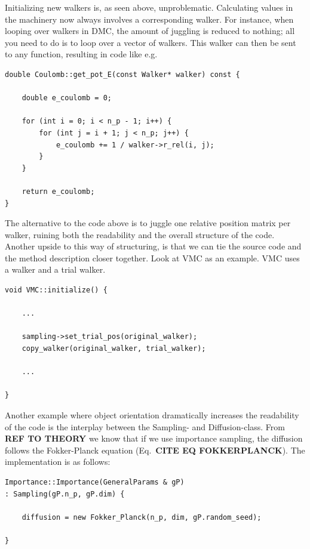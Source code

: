 Initializing new walkers is, as seen above, unproblematic. Calculating values in the machinery now always involves a corresponding walker. For instance, when looping over walkers in DMC, the amount of juggling is reduced to nothing; all you need to do is to loop over a vector of walkers. This walker can then be sent to any function, resulting in code like e.g.

\vspace{0.5cm}
\begin{lstlisting}
double Coulomb::get_pot_E(const Walker* walker) const {
    
    double e_coulomb = 0;

    for (int i = 0; i < n_p - 1; i++) {
        for (int j = i + 1; j < n_p; j++) {
            e_coulomb += 1 / walker->r_rel(i, j);
        }
    }

    return e_coulomb;
}
\end{lstlisting}

The alternative to the code above is to juggle one relative position matrix per walker, ruining both the readability and the overall structure of the code. Another upside to this way of structuring, is that we can tie the source code and the method description closer together. Look at VMC as an example. VMC uses a walker and a trial walker. 

\vspace{0.5cm}
\begin{lstlisting}
void VMC::initialize() {
    
    ...

    sampling->set_trial_pos(original_walker);
    copy_walker(original_walker, trial_walker);
    
    ...
    
}

\end{lstlisting}

Another example where object orientation dramatically increases the readability of the code is the interplay between the Sampling- and Diffusion-class. From \textbf{REF TO THEORY} we know that if we use importance sampling, the diffusion follows the Fokker-Planck equation (Eq.~\textbf{CITE EQ FOKKERPLANCK}). The implementation is as follows:

\vspace{0.5cm}
\begin{lstlisting}
Importance::Importance(GeneralParams & gP)
: Sampling(gP.n_p, gP.dim) {

    diffusion = new Fokker_Planck(n_p, dim, gP.random_seed);

}
\end{lstlisting}


